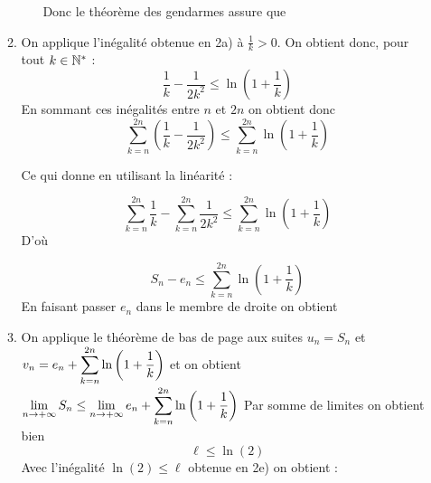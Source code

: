 \documentclass[a4paper, 11pt]{article}
\begin{document}
\begin{correction}
\begin{enumerate}
\begin{enumerate}
\begin{enumerate}
Donc le théorème des gendarmes assure que 

\end{enumerate}


\item On applique l'inégalité obtenue en 2a) à $\frac{1}{k}>0$. On obtient donc, pour tout $k\in \mathbb{N}^*$ : 
$$\frac{1}{k}-\frac{1}{2k^2}\leq \ln\left(1+\frac{1}{k} \right)$$
En sommant ces inégalités entre $n$ et $2n$ on obtient donc 
$$\sum_{k=n}^{2n} \left(\frac{1}{k}-\frac{1}{2k^2}\right) \leq \sum_{k=n}^{2n}\ln\left(1+\frac{1}{k} \right)$$

Ce qui donne en utilisant la linéarité : 

$$\sum_{k=n}^{2n} \frac{1}{k}-\sum_{k=n}^{2n}  \frac{1}{2k^2} \leq \sum_{k=n}^{2n}\ln\left(1+\frac{1}{k} \right)$$
D'où 

$$S_n - e_n \leq \sum_{k=n}^{2n}\ln\left(1+\frac{1}{k} \right)$$
En faisant passer $e_n$ dans le membre de droite on obtient 

\item On applique le théorème de bas de page aux suites 
$u_n=S_n$ et $v_n =e_n +  \displaystyle \sum_{k=n}^{2n}\ln\left(1+\frac{1}{k} \right)$ et on obtient 
$\displaystyle \lim_{n\rightarrow +\infty} S_n \leq \lim_{n\rightarrow +\infty} e_n +  \sum_{k=n}^{2n}\ln\left(1+\frac{1}{k} \right)$
Par somme de limites on obtient bien 
$$\ell \leq \ln(2)$$
Avec l'inégalité $\ln(2)\leq \ell$ obtenue en 2e) on obtient : 

\end{enumerate}
\end{enumerate}
\end{correction}










\end{document}
